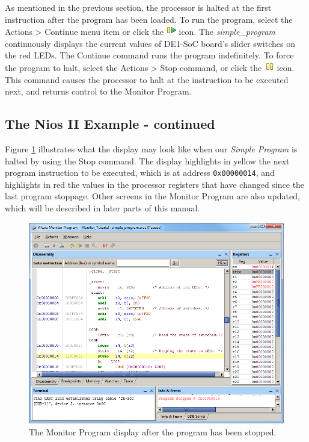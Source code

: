 \documentclass[11pt, twoside, pdftex]{article}
\begin{document}
As mentioned in the previous section, the processor is halted at
the first instruction after the program has been loaded. 
To run the program, select the \textsf{Actions > Continue} menu
item or click the \includegraphics{toolbar/continue.png} icon.  The {\it simple\_program} continuously displays the current
values of DE1-SoC board's slider switches on the red LEDs.
The \textsf{Continue} command runs the program indefinitely.
To force the program to halt,
select the \textsf{Actions > Stop} command, or click the
\includegraphics{toolbar/stop.png} icon. This command causes the
processor to halt at the instruction to be executed next, and
returns control to the Monitor Program.

\subsection{The Nios II Example - continued} 
\label{tut:nios_3}

Figure \ref{fig:AMP_stoppedprogram_nios} illustrates what the display may look like when
our {\it Simple Program} is halted by using the 
{\sf Stop} command. 
The display highlights in yellow the next program instruction to
be executed, which is at address \texttt {0x00000014},
and highlights in red the values in the processor
registers that have changed since the last program stoppage.
Other screens in the Monitor Program are also updated, which will
be described in later parts of this manual.

\begin{figure}[H]
   \begin{center}
      \includegraphics[scale=0.6]{screenshots/figure20.png}
   \end{center}
   \caption{The Monitor Program display after the program has been stopped.} 
   \label{fig:AMP_stoppedprogram_nios}
\end{figure}
\end{document}
